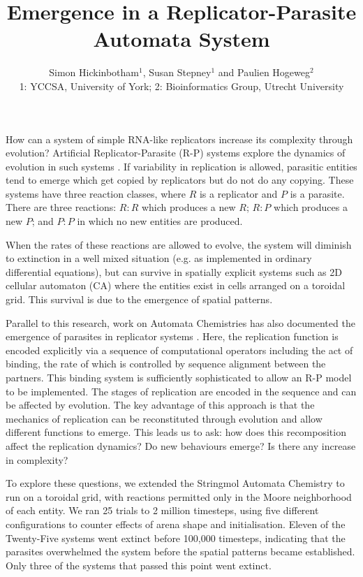 \documentclass[twocolumn]{article}
\title{Emergence in a Replicator-Parasite Automata System}
\author{Simon Hickinbotham$^1$, Susan Stepney$^1$ and Paulien Hogeweg$^2$\\{\normalsize 1: YCCSA, University of York; 2: Bioinformatics Group, Utrecht University}}
\date{\vspace{-3ex}}
\begin{document}
\maketitle


How can a system of simple RNA-like replicators increase its complexity
through evolution? Artificial Replicator-Parasite (R-P) systems
explore the dynamics of evolution in such systems  \cite{ph1}.
If variability in replication is allowed, parasitic entities tend to
emerge which get copied by replicators but do not do any copying. These
systems have three reaction classes, where $R$ is a replicator and
$P$ is a parasite. There are three reactions: $R:R$ which produces a
new $R$; $R:P$ which produces a new $P$; and $P:P$ in which no
new entities are produced.

When the rates of these reactions are allowed to evolve, the system 
will diminish to extinction in a well mixed situation (e.g. as implemented 
in ordinary differential equations), but can survive in spatially explicit systems 
such as 2D cellular automaton (CA)
 where the entities exist in cells arranged on a toroidal grid.
This survival is due to the emergence of spatial patterns.

Parallel to this research, work on Automata Chemistries has also
documented the emergence of parasites in replicator systems \cite{stringmol}. Here,
the replication function is encoded explicitly via a sequence of
computational operators including the act of binding, the rate of which is controlled by sequence alignment between the partners. This binding system is sufficiently sophisticated to allow
an  R-P model to be implemented.
The stages of replication are
encoded in the sequence and can be affected by evolution. The key
advantage of this approach is that the mechanics of replication can be
reconstituted through evolution and allow different functions to emerge.
This leads us to ask: how does this recomposition affect the
replication dynamics? Do new behaviours emerge? Is there any increase in
complexity?

To explore these questions, we extended the Stringmol Automata Chemistry to run on a toroidal
grid, with reactions permitted only in the Moore neighborhood of each entity. We ran 25
trials to 2 million timesteps, using five different configurations to
counter effects of arena shape and initialisation.
%
Eleven of the Twenty-Five systems went extinct
before 100,000 timesteps, indicating that the parasites overwhelmed the
system before the spatial patterns became established. Only three of the
systems that passed this point went extinct.
\end{document}
